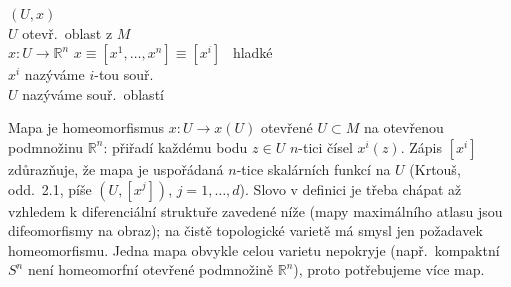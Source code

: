 \begin{minipage}{0.6\textwidth}
\begin{definice}
 $(U,x)$ \\
\quad $U$ otevř.\ oblast z $M$ \\
\quad $x: U\to\mathbb{R}^n$ \qquad $x\equiv[x^1,\dots,x^n]\equiv[x^i]$ \ hladké \\[2pt]
\quad $x^i$ nazýváme $i$-tou souř. \\
\quad $U$ nazýváme souř.\ oblastí
\end{definice}
\end{minipage}\hfill
\begin{minipage}{0.37\textwidth}
\end{minipage}

\begin{vysvetleni}
Mapa je homeomorfismus $x:U\to x(U)$ otevřené $U\subset M$ na otevřenou podmnožinu $\mathbb{R}^n$: přiřadí každému bodu $z\in U$ $n$-tici čísel $x^i(z)$. Zápis $[x^i]$ zdůrazňuje, že mapa je uspořádaná $n$-tice skalárních funkcí na $U$ (Krtouš, odd.~2.1, píše $(U,[x^j])$, $j=1,\dots,d$). Slovo  v definici je třeba chápat až vzhledem k diferenciální struktuře zavedené níže (mapy maximálního atlasu jsou difeomorfismy na obraz); na čistě topologické varietě má smysl jen požadavek homeomorfismu. Jedna mapa obvykle celou varietu nepokryje (např.\ kompaktní $S^n$ není homeomorfní otevřené podmnožině $\mathbb{R}^n$), proto potřebujeme více map.
\end{vysvetleni}

